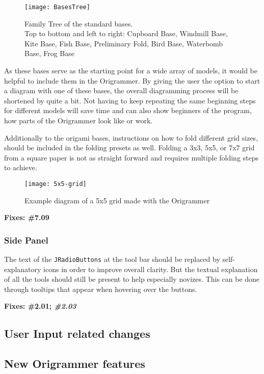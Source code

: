  \begin{figure}[htbp]
	\centering
	\texttt{[image: BasesTree]}
	\caption{Family Tree of the standard bases.\\
	Top to bottom and left to right:  Cupboard Base, Windmill Base, Kite Base, Fish Base, Preliminary Fold, Bird Base, Waterbomb Base, Frog Base\cite{BaseTree}}
	\label{fig:basesTree}
\end{figure}

As these bases serve as the starting point for a wide array of models, it would be helpful to include them in the Origrammer. By giving the user the option to start a diagram with one of these bases, the overall diagramming process will be shortened by quite a bit. Not having to keep repeating the same beginning steps for different models will save time and can also show beginners of the program, how parts of the Origrammer look like or work.

Additionally to the origami bases, instructions on how to fold different grid sizes, should be included in the folding presets as well. Folding a 3x3, 5x5, or 7x7 grid from a square paper is not as straight forward and requires multiple folding steps to achieve. 

 \begin{figure}[htbp]
	\centering
	\texttt{[image: 5x5-grid]}
	\caption{Example diagram of a 5x5 grid made with the Origrammer}
	\label{fig:5x5-grid}
\end{figure}


\textbf{Fixes: \#7.09}

\subsubsection{Side Panel}

The text of the \texttt{JRadioButtons} at the tool bar should be replaced by self-explanatory icons in order to improve overall clarity. But the textual explanation of all the tools should still be present to help especially novizes. This can be done through tooltips that appear when hovering over the buttons.

\textbf{Fixes: \#2.01; \emph{\#2.03}}

\subsection{User Input related changes}

\subsection{New Origrammer features}

